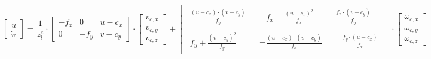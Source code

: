 \documentclass[12pt, onecolumn]{article}
\begin{document}
	\begin{equation}
	\begin{bmatrix}
			\dot{u}\\\dot{v}
		\end{bmatrix}=\frac{1}{z_l^c}\cdot\begin{bmatrix}
		-f_x&0&u-c_x\\
		0&-f_y&v-c_y
		\end{bmatrix}\cdot\begin{bmatrix}
			v_{c,x}\\
			v_{c,y}\\
			v_{c,z}
			\end{bmatrix}+\begin{bmatrix}
			\begin{aligned}
			\frac{\left( u-c_x\right) \cdot\left( v-c_y\right)}{f_y}
			\end{aligned}&
			\begin{aligned}
			-f_x-\frac{\left( u-c_x\right)^2}{f_x}
			\end{aligned}&
			\begin{aligned}
			\frac{f_x\cdot \left( v-c_y\right)}{f_y}
			\end{aligned}\\
			\begin{aligned}
			f_y+\frac{\left( v-c_y\right)^2}{f_y}
			\end{aligned}&
			\begin{aligned}
			-\frac{\left( u-c_x\right)\cdot\left( v-c_y\right)}{f_x}
			\end{aligned}&
			\begin{aligned}
			-\frac{f_y\cdot \left( u-c_x\right)}{f_x}
			\end{aligned}
			\end{bmatrix}\cdot\begin{bmatrix}
				\omega_{c,x}\\
				\omega_{c,y}\\
				\omega_{c,z}
				\end{bmatrix}
	\end{equation}
\end{document}
